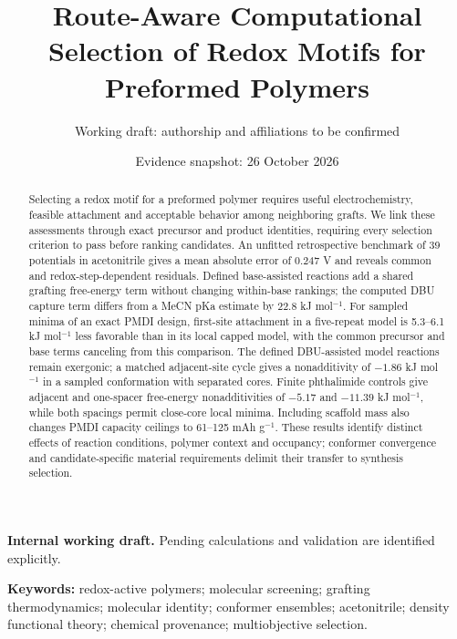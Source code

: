 \documentclass[11pt]{article}
\title{Route-Aware Computational Selection of Redox Motifs for Preformed Polymers}
\author{Working draft: authorship and affiliations to be confirmed}
\date{Evidence snapshot: 26 October 2026}
\begin{document}
\maketitle
\begin{center}\small\textbf{Internal working draft.} Pending calculations and validation are identified explicitly.\end{center}

\begin{abstract}
Selecting a redox motif for a preformed polymer requires useful electrochemistry, feasible attachment and acceptable behavior among neighboring grafts. We link these assessments through exact precursor and product identities, requiring every selection criterion to pass before ranking candidates. An unfitted retrospective benchmark of 39 potentials in acetonitrile gives a mean absolute error of 0.247 V and reveals common and redox-step-dependent residuals. Defined base-assisted reactions add a shared grafting free-energy term without changing within-base rankings; the computed DBU capture term differs from a MeCN pKa estimate by 22.8 kJ mol$^{-1}$. For sampled minima of an exact PMDI design, first-site attachment in a five-repeat model is 5.3--6.1 kJ mol$^{-1}$ less favorable than in its local capped model, with the common precursor and base terms canceling from this comparison. The defined DBU-assisted model reactions remain exergonic; a matched adjacent-site cycle gives a nonadditivity of $-1.86$ kJ mol$^{-1}$ in a sampled conformation with separated cores. Finite phthalimide controls give adjacent and one-spacer free-energy nonadditivities of $-5.17$ and $-11.39$ kJ mol$^{-1}$, while both spacings permit close-core local minima. Including scaffold mass also changes PMDI capacity ceilings to 61--125 mAh g$^{-1}$. These results identify distinct effects of reaction conditions, polymer context and occupancy; conformer convergence and candidate-specific material requirements delimit their transfer to synthesis selection.
\end{abstract}
\noindent\textbf{Keywords:} redox-active polymers; molecular screening; grafting thermodynamics; molecular identity; conformer ensembles; acetonitrile; density functional theory; chemical provenance; multiobjective selection.
\end{document}
